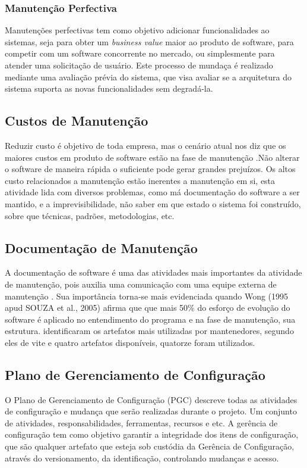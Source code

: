 \subsubsection{Manutenção Perfectiva}
Manutenções perfectivas tem como objetivo adicionar funcionalidades ao sistemas, seja para obter um \textit{business value} maior ao produto de software, para competir com um software concorrente no mercado, ou simplesmente para atender uma solicitação de usuário. Este processo de mundaça é realizado mediante uma avaliação prévia  do sistema, que visa avaliar se a arquitetura do sistema suporta as novas funcionalidades sem degradá-la.
\subsection{Custos de Manutenção}
Reduzir custo é objetivo de toda empresa, mas o cenário atual nos diz que os maiores custos em produto de software estão na fase de manutenção \cite{pigoski1997}.Não alterar o software de maneira rápida o suficiente pode gerar grandes prejuízos. Os altos custo relacionados a manutenção estão inerentes a manutenção em si, esta atividade lida com diversos problemas, como má documentação do software a ser mantido, e a imprevisibilidade, não saber em que estado o sistema foi construído, sobre que técnicas, padrões, metodologias, etc. 
\subsection{Documentação de Manutenção}
A documentação de software é uma das atividades mais importantes da atividade de manutenção, pois auxilia uma comunicação com uma equipe externa de manutenção \cite{sergio2005}. Sua importância torna-se mais evidenciada quando Wong (1995 apud SOUZA et al., 2005) afirma que que mais 50\% do esforço de evolução do software é aplicado no entendimento do programa e na fase de manutenção, sua estrutura.  identificaram os artefatos mais utilizadas por mantenedores, segundo eles de vite e quatro artefatos disponíveis, quatorze foram utilizados.
\subsection{Plano de Gerenciamento de Configuração}
O Plano de Gerenciamento de Configuração (PGC) descreve todas as atividades de configuração e mudança que serão realizadas durante o projeto. Um conjunto de atividades, responsabilidades, ferramentas, recursos e etc. A gerência de configuração tem como objetivo garantir a integridade dos itens de configuração, que são qualquer artefato que esteja sob custódia da Gerência de Configuração, através do versionamento, da identificação, controlando mudanças e acesso. 
